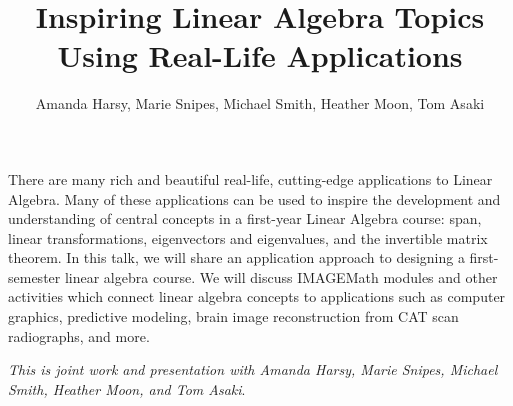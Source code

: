 \documentclass[a4paper]{amsart}
\date{}
\begin{document}
\title{Inspiring Linear Algebra Topics Using Real-Life Applications}
\author{Amanda Harsy, Marie Snipes, Michael Smith, Heather Moon, Tom Asaki} %
\address{Lewis University, Kenyon College, Lewis University, Washington State University, Washington State University} %

\maketitle

There are many rich and beautiful real-life, cutting-edge applications to Linear Algebra.  Many of these applications can be used to inspire the development and understanding of central concepts in a first-year Linear Algebra course: span, linear transformations, eigenvectors and eigenvalues, and the invertible matrix theorem.  In this talk, we will share an application approach to designing a first-semester linear algebra course.  We will discuss IMAGEMath modules and other activities which connect linear algebra concepts to applications such as computer graphics, predictive modeling, brain image reconstruction from CAT scan radiographs, and more.






\emph{This is joint work and presentation with Amanda Harsy, Marie Snipes, Michael Smith, Heather Moon, and Tom Asaki}.


\end{document}
